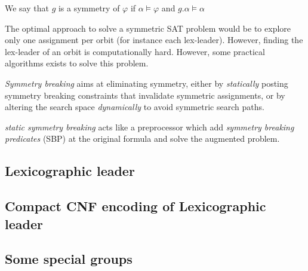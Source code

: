 We say that $g$ is a symmetry of $\varphi$ if $\alpha \models \varphi$ and $ g.\alpha \models \alpha$


The optimal approach to solve a symmetric SAT problem would be to explore
only one assignment per orbit (for instance each lex-leader). However, finding the
lex-leader of an orbit is computationally hard. 
However, some practical algorithms exists to solve this problem.


\emph{Symmetry breaking} aims at eliminating symmetry, either
by \emph{statically} posting symmetry breaking constraints that invalidate symmetric
assignments, or by altering the search space \emph{dynamically} to avoid symmetric search paths.

\emph{static symmetry breaking} acts like a preprocessor which add \emph{symmetry breaking predicates} (SBP)
at the original formula and solve the augmented problem.


\subsection{Lexicographic leader}
\subsection{Compact CNF encoding of Lexicographic leader}

\subsection{Some special groups}




